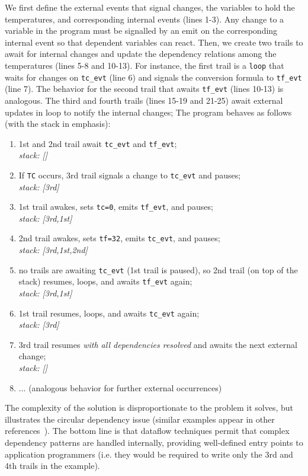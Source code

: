 \documentclass[preprint]{sigplanconf}
\newcommand{\code}[1] {{\small{\texttt{#1}}}}
\newcommand{\1}{\;}
\newcommand{\2}{\;\;}
\newcommand{\3}{\;\;\;}
\newcommand{\5}{\;\;\;\;\;}
\begin{document}
We first define the external events that signal changes, the variables to hold 
the temperatures, and corresponding internal events (lines 1-3).
Any change to a variable in the program must be signalled by an emit on the 
corresponding internal event so that dependent variables can react.
Then, we create two trails to await for internal changes and update the 
dependency relations among the temperatures (lines 5-8 and 10-13).
For instance, the first trail is a \code{loop} that waits for changes on 
\code{tc\_evt} (line 6) and signals the conversion formula to \code{tf\_evt} 
(line 7).
The behavior for the second trail that awaits \code{tf\_evt} (lines 10-13) is 
analogous.
The third and fourth trails (lines 15-19 and 21-25) await external updates in
loop to notify the internal changes;
The program behaves as follows (with the stack in emphasis):

{\small
\begin{enumerate}
\setlength{\itemsep}{0pt}
\item 1st and 2nd trail await \code{tc\_evt} and \code{tf\_evt};\\
    \emph{stack: []}
\item If \code{TC} occurs, 3rd trail signals a change to \code{tc\_evt} and 
    pauses;\\
    \emph{stack: [3rd]}
\item 1st trail awakes, sets \code{tc=0}, emits \code{tf\_evt}, and pauses;\\
    \emph{stack: [3rd,1st]}
\item 2nd trail awakes, sets \code{tf=32}, emits \code{tc\_evt}, and pauses;\\
    \emph{stack: [3rd,1st,2nd]}
\item no trails are awaiting \code{tc\_evt} (1st trail is paused), so 2nd trail 
    (on top of the stack) resumes, loops, and awaits \code{tf\_evt} again;\\
    \emph{stack: [3rd,1st]}
\item 1st trail resumes, loops, and awaits \code{tc\_evt} again;\\
    \emph{stack: [3rd]}
\item 3rd trail resumes \emph{with all dependencies resolved} and awaits the 
    next external change;\\
    \emph{stack: []}
\item ... (analogous behavior for further external occurrences)
\end{enumerate}
}

The complexity of the solution is disproportionate to the problem it solves, 
but illustrates the circular dependency issue (similar examples appear in other 
references~\cite{frp.survey,frtime.embedding}).
The bottom line is that dataflow techniques permit that complex dependency 
patterns are handled internally, providing well-defined entry points to 
application programmers (i.e. they would be required to write only the 3rd and 
4th trails in the example).
\end{document}
